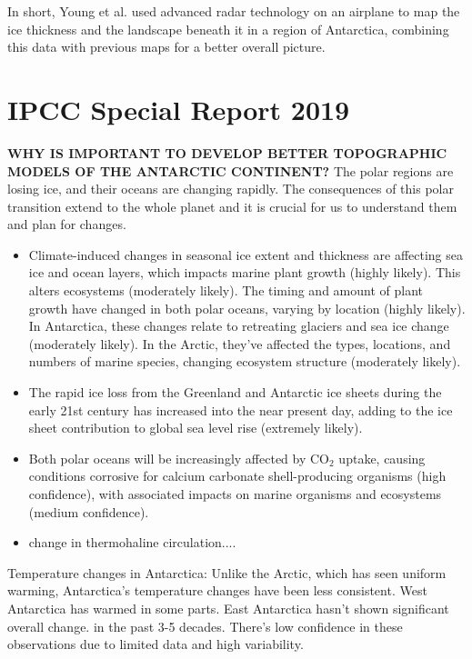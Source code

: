 In short, Young et al. used advanced radar technology on an airplane to map the ice thickness and the landscape beneath it in a region of Antarctica, combining this data with previous maps for a better overall picture.

\chapter{IPCC Special Report 2019}\label{n2}
\textbf{WHY IS IMPORTANT TO DEVELOP BETTER TOPOGRAPHIC MODELS OF THE ANTARCTIC CONTINENT?}
The polar regions are losing ice, and their oceans are changing rapidly. The consequences of this polar transition extend to the whole planet and it is crucial for us to understand them and plan for changes.
\begin{itemize}
\item Climate-induced changes in seasonal ice extent and thickness are affecting sea ice and ocean layers, which impacts marine plant growth (highly likely). This alters ecosystems (moderately likely). The timing and amount of plant growth have changed in both polar oceans, varying by location (highly likely). In Antarctica, these changes relate to retreating glaciers and sea ice change (moderately likely). In the Arctic, they've affected the types, locations, and numbers of marine species, changing ecosystem structure (moderately likely)\cite{O_C_in_changingClimate}.
\item The rapid ice loss from the Greenland and Antarctic ice sheets during the early 21st century has increased into the near present day, adding to the ice sheet contribution to global sea level rise (extremely likely)\cite{O_C_in_changingClimate}.
\item Both polar oceans will be increasingly affected by $\mathrm{CO_2}$ uptake, causing conditions corrosive for calcium carbonate shell-producing organisms (high conﬁdence), with associated impacts on marine organisms and ecosystems (medium conﬁdence)\cite{O_C_in_changingClimate}.
\item change in thermohaline circulation....
\end{itemize}

Temperature changes in Antarctica:
Unlike the Arctic, which has seen uniform warming, Antarctica's temperature changes have been less consistent. West Antarctica has warmed in some parts. East Antarctica hasn't shown significant overall change. in the past 3-5 decades. There's low confidence in these observations due to limited data and high variability.

